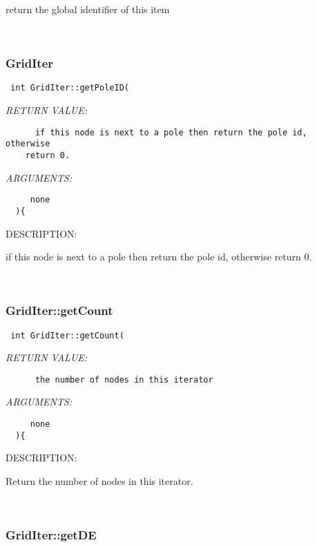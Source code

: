    return the global identifier of this item
   
 
\mbox{}\hrulefill\
 
\subsubsection [GridIter] {GridIter }


  
\begin{verbatim} int GridIter::getPoleID(\end{verbatim}{\em RETURN VALUE:}
\begin{verbatim}      if this node is next to a pole then return the pole id, otherwise 
    return 0.\end{verbatim}{\em ARGUMENTS:}
\begin{verbatim}     none  
  ){\end{verbatim}
{\sf DESCRIPTION:\\ }


      if this node is next to a pole then return the pole id, otherwise 
    return 0.
   
 
\mbox{}\hrulefill\
 
\subsubsection [GridIter::getCount] {GridIter::getCount}


  
\begin{verbatim} int GridIter::getCount(\end{verbatim}{\em RETURN VALUE:}
\begin{verbatim}      the number of nodes in this iterator\end{verbatim}{\em ARGUMENTS:}
\begin{verbatim}     none  
  ){\end{verbatim}
{\sf DESCRIPTION:\\ }


   Return the number of nodes in this iterator. 
   
 
\mbox{}\hrulefill\
 
\subsubsection [GridIter::getDE] {GridIter::getDE}


